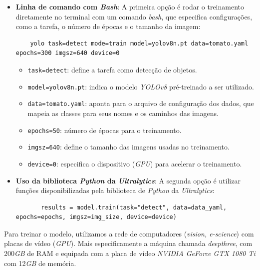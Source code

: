 \begin{itemize}
    \item \textbf{Linha de comando com \emph{Bash}}: A primeira opção é rodar o treinamento diretamente no terminal com um comando \emph{bash}, que especifica configurações, como a tarefa, o número de épocas e o tamanho da imagem:

\begin{lstlisting}
    yolo task=detect mode=train model=yolov8n.pt data=tomato.yaml epochs=300 imgsz=640 device=0 
\end{lstlisting}

   \begin{itemize}
       \item \texttt{task=detect}: define a tarefa como detecção de objetos.
       \item \texttt{model=yolov8n.pt}: indica o modelo \emph{YOLOv8} pré-treinado a ser utilizado.
       \item \texttt{data=tomato.yaml}: aponta para o arquivo de configuração dos dados, que mapeia as classes para seus nomes e os caminhos das imagens.
       \item \texttt{epochs=50}: número de épocas para o treinamento.
       \item \texttt{imgsz=640}: define o tamanho das imagens usadas no treinamento.
       \item \texttt{device=0}: especifica o dispositivo (\emph{GPU}) para acelerar o treinamento.
   \end{itemize}

    \item \textbf{Uso da biblioteca \emph{Python} da \emph{Ultralytics}}: A segunda opção é utilizar funções disponibilizadas pela biblioteca de \emph{Python} da \emph{Ultralytics}:
    \begin{lstlisting}
       results = model.train(task="detect", data=data_yaml, epochs=epochs, imgsz=img_size, device=device)
    \end{lstlisting}
\end{itemize}
Para treinar o modelo, utilizamos a rede de computadores (\emph{vision, e-science}) com placas de vídeo (\emph{GPU}). Mais especificamente a máquina chamada \emph{deepthree}, com 200\emph{GB} de RAM e equipada com a placa de vídeo \emph{NVIDIA GeForce GTX 1080 Ti} com 12\emph{GB} de memória.


